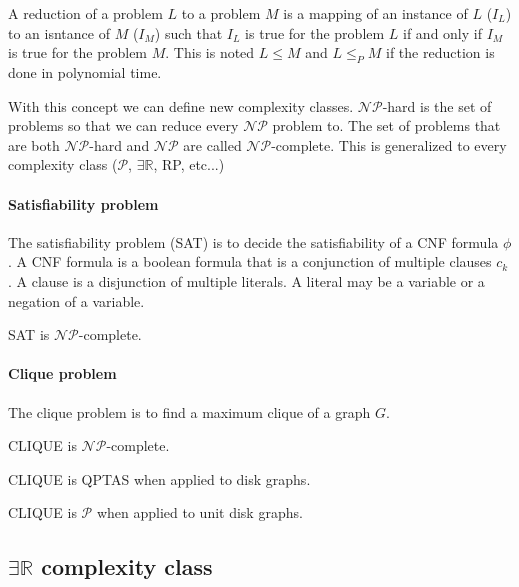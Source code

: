 \begin{defn}
  A reduction of a problem $L$ to a problem $M$ is a mapping of an instance of $L$ ($I_L$)
  to an isntance of $M$ ($I_M$) such that $I_L$ is true for the problem $L$ if and
  only if $I_M$ is true for the problem $M$. This is noted $L \leq M$ and $L \leq_P M$
  if the reduction is done in polynomial time.
\end{defn}

With this concept we can define new complexity classes. $\mathcal{NP}$-hard is
the set of problems so that we can reduce every $\mathcal{NP}$ problem to. The set
of problems that are both $\mathcal{NP}$-hard and $\mathcal{NP}$ are called $\mathcal{NP}$-complete.
This is generalized to every complexity class ($\mathcal{P}$, $\exists \mathbb{R}$, RP, etc...)

\paragraph{Satisfiability problem} The satisfiability problem (SAT) is to decide the satisfiability
of a CNF formula $\phi$. A CNF formula is a boolean formula that is a conjunction of multiple
clauses $c_k$. A clause is a disjunction of multiple literals. A literal may be a variable
or a negation of a variable.

\begin{theorem}
  SAT is $\mathcal{NP}$-complete.
\end{theorem}

\paragraph{Clique problem} The clique problem is to find a maximum clique of a graph
$G$.

\begin{theorem}
  CLIQUE is $\mathcal{NP}$-complete. \cite{Karp1972}
\end{theorem}

\begin{theorem}
  CLIQUE is QPTAS when applied to disk graphs. \cite{DBLP:journals/corr/abs-1712-05010}
\end{theorem}

\begin{theorem}
  CLIQUE is $\mathcal{P}$ when applied to unit disk graphs. \cite{CLARK1990165}
\end{theorem}

\subsection{$\exists \mathbb{R}$ complexity class}

